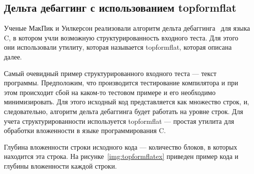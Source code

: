 \subsection{Дельта дебаггинг с использованием topformflat}
Ученые МакПик и Уилкерсон реализовали алгоритм дельта дебаггинга~\cite{delta} для языка C, в котором учли возможную структурированность входного теста. Для этого они использовали утилиту, которая называется topformflat, которая описана далее.

Самый очевидный пример структурированного входного теста --- текст программы. Предположим, что производится тестирование компилятора и при этом происходит сбой на каком-то тестовом примере и его необходимо минимизировать. Для этого исходный код представляется как множество строк, и, следовательно, алгоритм дельта дебаггинга будет работать на уровне строк. Для учета структурированности используется topformflat --- простая утилита для обработки вложенности в языке программирования C. 

Глубина вложенности строки исходного кода --- количество блоков, в которых находится эта строка. На рисунке~\ref{img:topformflatex} приведен пример кода и глубины вложенности каждой строки.

